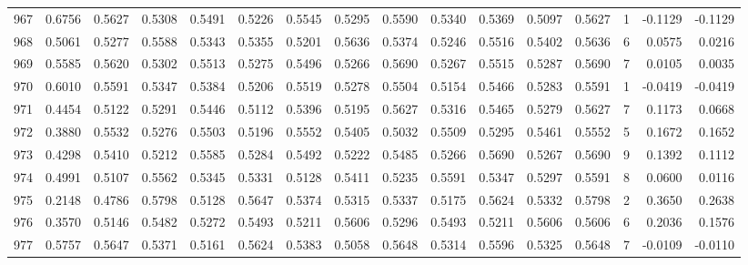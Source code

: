 \begin{tabular}{lrrrrrrrrrrrrrrr}
967 &      0.6756 &  0.5627 &  0.5308 &  0.5491 &  0.5226 &  0.5545 &  0.5295 &  0.5590 &  0.5340 &  0.5369 &   0.5097 &     0.5627 &      1 &                   -0.1129 &                    -0.1129 \\
968 &      0.5061 &  0.5277 &  0.5588 &  0.5343 &  0.5355 &  0.5201 &  0.5636 &  0.5374 &  0.5246 &  0.5516 &   0.5402 &     0.5636 &      6 &                    0.0575 &                     0.0216 \\
969 &      0.5585 &  0.5620 &  0.5302 &  0.5513 &  0.5275 &  0.5496 &  0.5266 &  0.5690 &  0.5267 &  0.5515 &   0.5287 &     0.5690 &      7 &                    0.0105 &                     0.0035 \\
970 &      0.6010 &  0.5591 &  0.5347 &  0.5384 &  0.5206 &  0.5519 &  0.5278 &  0.5504 &  0.5154 &  0.5466 &   0.5283 &     0.5591 &      1 &                   -0.0419 &                    -0.0419 \\
971 &      0.4454 &  0.5122 &  0.5291 &  0.5446 &  0.5112 &  0.5396 &  0.5195 &  0.5627 &  0.5316 &  0.5465 &   0.5279 &     0.5627 &      7 &                    0.1173 &                     0.0668 \\
972 &      0.3880 &  0.5532 &  0.5276 &  0.5503 &  0.5196 &  0.5552 &  0.5405 &  0.5032 &  0.5509 &  0.5295 &   0.5461 &     0.5552 &      5 &                    0.1672 &                     0.1652 \\
973 &      0.4298 &  0.5410 &  0.5212 &  0.5585 &  0.5284 &  0.5492 &  0.5222 &  0.5485 &  0.5266 &  0.5690 &   0.5267 &     0.5690 &      9 &                    0.1392 &                     0.1112 \\
974 &      0.4991 &  0.5107 &  0.5562 &  0.5345 &  0.5331 &  0.5128 &  0.5411 &  0.5235 &  0.5591 &  0.5347 &   0.5297 &     0.5591 &      8 &                    0.0600 &                     0.0116 \\
975 &      0.2148 &  0.4786 &  0.5798 &  0.5128 &  0.5647 &  0.5374 &  0.5315 &  0.5337 &  0.5175 &  0.5624 &   0.5332 &     0.5798 &      2 &                    0.3650 &                     0.2638 \\
976 &      0.3570 &  0.5146 &  0.5482 &  0.5272 &  0.5493 &  0.5211 &  0.5606 &  0.5296 &  0.5493 &  0.5211 &   0.5606 &     0.5606 &      6 &                    0.2036 &                     0.1576 \\
977 &      0.5757 &  0.5647 &  0.5371 &  0.5161 &  0.5624 &  0.5383 &  0.5058 &  0.5648 &  0.5314 &  0.5596 &   0.5325 &     0.5648 &      7 &                   -0.0109 &                    -0.0110 \\

\end{tabular}
